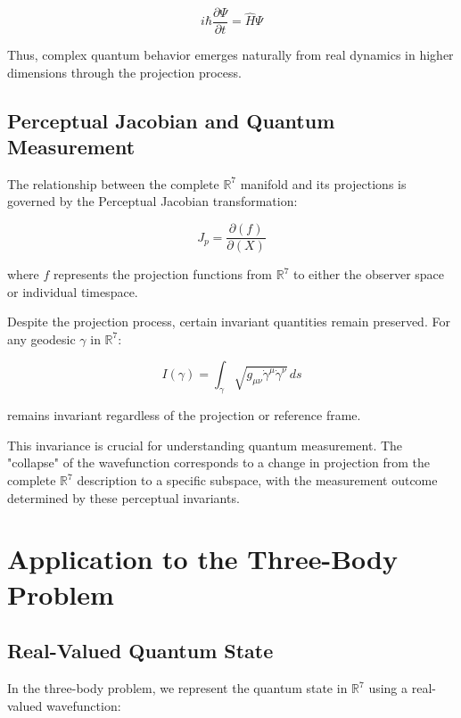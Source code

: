 \documentclass{article}
\begin{document}
\begin{equation}
i\hbar \frac{\partial \Psi}{\partial t} = \hat{H} \Psi
\end{equation}

Thus, complex quantum behavior emerges naturally from real dynamics in higher dimensions through the projection process.

\subsection{Perceptual Jacobian and Quantum Measurement}

The relationship between the complete $\mathbb{R}^7$ manifold and its projections is governed by the Perceptual Jacobian transformation:

\begin{equation}
J_p = \frac{\partial(f)}{\partial(X)}
\end{equation}

where $f$ represents the projection functions from $\mathbb{R}^7$ to either the observer space or individual timespace.

Despite the projection process, certain invariant quantities remain preserved. For any geodesic $\gamma$ in $\mathbb{R}^7$:

\begin{equation}
I(\gamma) = \int_\gamma \sqrt{g_{\mu\nu}\dot{\gamma}^\mu\dot{\gamma}^\nu} \, ds
\end{equation}

remains invariant regardless of the projection or reference frame.

This invariance is crucial for understanding quantum measurement. The "collapse" of the wavefunction corresponds to a change in projection from the complete $\mathbb{R}^7$ description to a specific subspace, with the measurement outcome determined by these perceptual invariants.

\section{Application to the Three-Body Problem}

\subsection{Real-Valued Quantum State}

In the three-body problem, we represent the quantum state in $\mathbb{R}^7$ using a real-valued wavefunction:
\end{document}
